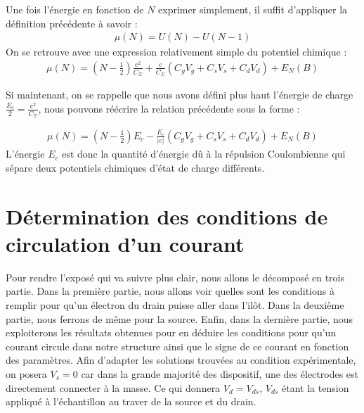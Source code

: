 Une fois l'énergie en fonction de $N$ exprimer simplement, il suffit d'appliquer la définition précédente à savoir :
\begin{eqnarray}
\mu(N) = U(N) - U(N-1) \nonumber
\end{eqnarray}
On se retrouve avec une expression relativement simple du potentiel chimique :
\begin{eqnarray}
\mu(N) = (N-\frac{1}{2})\frac{e^2}{C_{\Sigma}}
+ 
\frac{e}{C_{\Sigma}}(C_gV_g + C_sV_s + C_dV_d)
+
E_N(B)
\end{eqnarray}

Si maintenant, on se rappelle que nous avons défini plus haut l'énergie de charge $\frac{E_c}{2} = \frac{e^2}{C_{\Sigma}}$, nous pouvons réécrire la relation précédente sous la forme :

\begin{eqnarray}
\mu(N) = (N-\frac{1}{2})E_c
- 
\frac{E_c}{|e|}(C_gV_g + C_sV_s + C_dV_d)
+
E_N(B)
\label{pot_chim}
\end{eqnarray}
L'énergie $E_c$ est donc la quantité d'énergie d\^u à la répulsion Coulombienne qui sépare deux potentiels chimiques d'état de charge différents.


\section{Détermination des conditions de circulation d'un courant}
Pour rendre l'exposé qui va suivre plus clair, nous allons le décomposé en trois partie. Dans la première partie, nous allons voir quelles sont les conditions à remplir pour qu'un électron du drain puisse aller dans l'il\^ot. Dans la deuxième partie, nous ferrons de m\^eme pour la source. Enfin, dans la dernière partie, nous exploiterons les résultats obtenues pour en déduire les conditions pour qu'un courant circule dans notre structure ainsi que le signe de ce courant en fonction des paramètres. Afin d'adapter les solutions trouvées au condition expérimentale, on posera $V_s = 0$ car dans la grande majorité des dispositif, une des électrodes est directement connecter à la masse. Ce qui donnera $V_d=V_{ds}$, $V_{ds}$ étant la tension appliqué à l'échantillon au traver de la source et du drain.

